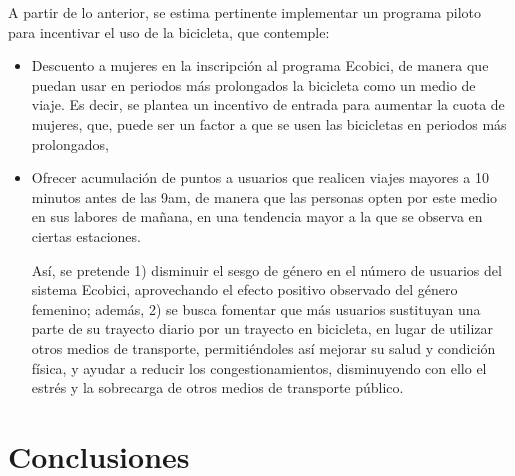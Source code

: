 \documentclass[9pt,twocolumn,twoside]{ilcss}
\begin{document}
A partir de lo anterior, se estima pertinente implementar un programa piloto para incentivar el uso de la bicicleta, que contemple:
\begin{itemize}
  \item Descuento a mujeres en la inscripción al programa Ecobici, de manera que puedan usar en periodos más prolongados la bicicleta como un medio de viaje. Es decir, se plantea un incentivo de entrada para aumentar la cuota de mujeres, que, puede ser un factor a que se usen las bicicletas en periodos más prolongados,
  \item Ofrecer acumulación de puntos a usuarios que realicen viajes mayores a 10 minutos antes de las 9am, de manera que las personas opten por este medio en sus labores de mañana, en una tendencia mayor a la que se observa en ciertas estaciones.
  

Así, se pretende 1) disminuir el sesgo de género en el número de usuarios del sistema Ecobici, aprovechando el efecto positivo observado del género femenino; además, 2) se busca fomentar que más usuarios sustituyan una parte de su trayecto diario por un trayecto en bicicleta, en lugar de utilizar otros medios de transporte, permitiéndoles así mejorar su salud y condición física, y ayudar a reducir los congestionamientos, disminuyendo con ello el estrés y la sobrecarga de otros medios de transporte público. 
\end{itemize}

\section{Conclusiones}
\end{document}
